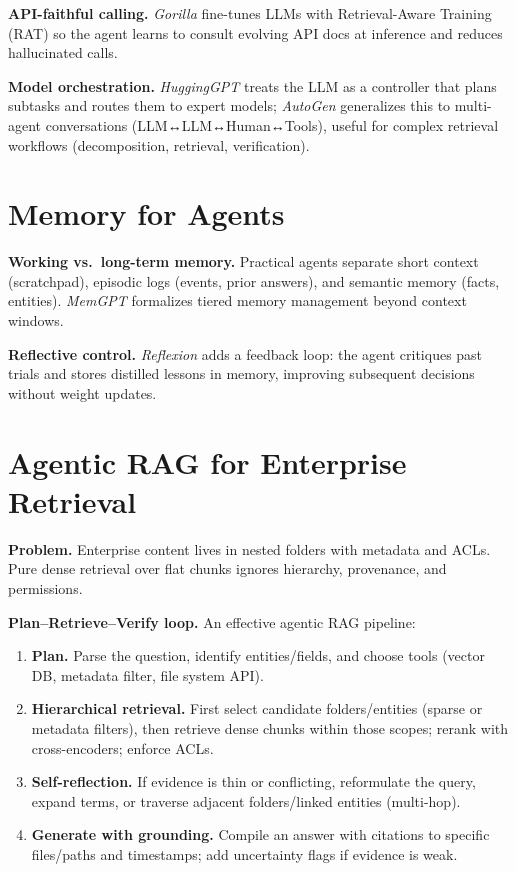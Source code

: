 \textbf{API-faithful calling.} \emph{Gorilla} fine-tunes LLMs with Retrieval-Aware Training (RAT) so the agent learns to consult evolving API docs at inference and reduces hallucinated calls.

\textbf{Model orchestration.} \emph{HuggingGPT} treats the LLM as a controller that plans subtasks and routes them to expert models; \emph{AutoGen} generalizes this to multi-agent conversations (LLM↔LLM↔Human↔Tools), useful for complex retrieval workflows (decomposition, retrieval, verification).

\section{Memory for Agents}
\textbf{Working vs.\ long-term memory.} Practical agents separate short context (scratchpad), episodic logs (events, prior answers), and semantic memory (facts, entities). \emph{MemGPT} formalizes tiered memory management beyond context windows.

\textbf{Reflective control.} \emph{Reflexion} adds a feedback loop: the agent critiques past trials and stores distilled lessons in memory, improving subsequent decisions without weight updates.

\section{Agentic RAG for Enterprise Retrieval}
\textbf{Problem.} Enterprise content lives in nested folders with metadata and ACLs. Pure dense retrieval over flat chunks ignores hierarchy, provenance, and permissions.

\textbf{Plan–Retrieve–Verify loop.} An effective agentic RAG pipeline:
\begin{enumerate}\itemsep2pt
    \item \textbf{Plan.} Parse the question, identify entities/fields, and choose tools (vector DB, metadata filter, file system API).
    \item \textbf{Hierarchical retrieval.} First select candidate folders/entities (sparse or metadata filters), then retrieve dense chunks within those scopes; rerank with cross-encoders; enforce ACLs.
    \item \textbf{Self-reflection.} If evidence is thin or conflicting, reformulate the query, expand terms, or traverse adjacent folders/linked entities (multi-hop).
    \item \textbf{Generate with grounding.} Compile an answer with citations to specific files/paths and timestamps; add uncertainty flags if evidence is weak.
\end{enumerate}


